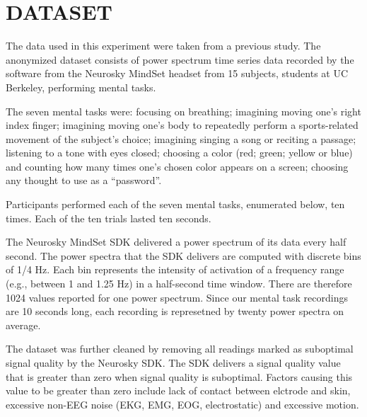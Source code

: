 
\section{\uppercase{Dataset}}

The data used in this experiment were taken from a previous study. \cite{adams_i_2013} The anonymized dataset consists of power spectrum time series data recorded by the software from the Neurosky MindSet headset from 15 subjects, students at UC Berkeley, performing mental tasks. 

The seven mental tasks were: focusing on breathing; imagining moving one's right index finger; imagining moving one's body to repeatedly perform a sports-related movement of the subject's choice; imagining singing a song or reciting a passage; listening to a tone with eyes closed; choosing a color (red; green; yellow or blue) and counting how many times one's chosen color appears on a screen; choosing any thought to use as a ``password''.

Participants performed each of the seven mental tasks, enumerated below, ten times. Each of the ten trials lasted ten seconds.

The Neurosky MindSet SDK delivered a power spectrum of its data every half second. The power spectra that the SDK delivers are computed with discrete bins of 1/4 Hz. Each bin represents the intensity of activation of a frequency range (e.g., between 1 and 1.25 Hz) in a half-second time window. There are therefore 1024 values reported for one power spectrum. Since our mental task recordings are 10 seconds long, each recording is represetned by twenty power spectra on average.

The dataset was further cleaned by removing all readings marked as suboptimal signal quality by the Neurosky SDK. The SDK delivers a signal quality value that is greater than zero when signal quality is suboptimal. Factors causing this value to be greater than zero include lack of contact between elctrode and skin, excessive non-EEG noise (EKG, EMG, EOG, electrostatic) and excessive motion.